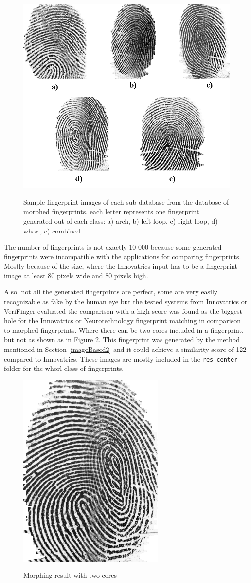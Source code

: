 \begin{figure}[H]
    \centering
        {\includegraphics[width=0.8\linewidth]{obrazky-figures/db_gen_example.png}}\\
        \caption{Sample fingerprint images of each sub-database from the database of morphed fingerprints, each letter represents one fingerprint generated out of each class: a) arch, b) left loop, c) right loop, d) whorl, e) combined.}
        \label{fig:db_morphed}
\end{figure}

The number of fingerprints is not exactly 10 000 because some generated fingerprints were incompatible with the applications for comparing fingerprints. Mostly because of the size, where the Innovatrics input has to be a fingerprint image at least 80 pixels wide and 80 pixels high.

Also, not all the generated fingerprints are perfect, some are very easily recognizable as fake by the human eye but the tested systems from Innovatrics or VeriFinger evaluated the comparison with a high score was found as the biggest hole for the Innovatrics or Neurotechnology fingerprint matching in comparison to morphed fingerprints. Where there can be two cores included in a fingerprint, but not as shown as in Figure \ref{fig:res_double_core}. This fingerprint was generated by the method mentioned in Section \ref{imageBased2} and it could achieve a similarity score of 122 compared to Innovatrics. These images are mostly included in the \texttt{res\_center} folder for the whorl class of fingerprints. 

\begin{figure}[H]
    \centering
        {\includegraphics[width=0.25\linewidth]{obrazky-figures/res_double_core.png}}\\
        \caption{Morphing result with two cores}
        \label{fig:res_double_core}
\end{figure}

